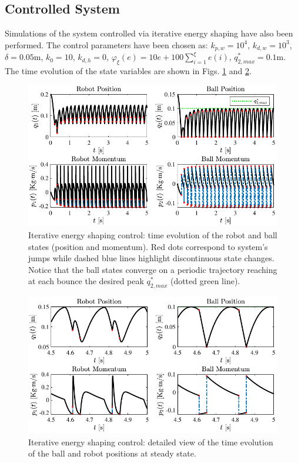 \subsection{Controlled System}
%
Simulations of the system controlled via iterative energy shaping have also been performed. The control parameters have been chosen as: $k_{p,w} = 10^4$, $k_{d,w} = 10^3$, $\delta = 0.05$m, $k_0 = 10$, $k_{d,h} = 0$, $\varphi_\xi(e) = 10e + 100\sum_{i = 1}^{\xi}e(i)$, $q_{2,max}^* = 0.1$m. The time evolution of the state variables are shown in Figs. \ref{fig:ctrl1} and \ref{fig:ctrl1_det}.
%
\begin{figure}[!ht]
	\centering
	\includegraphics[width=\linewidth]{Figures/ctrl1.pdf}
	\caption[Iterative energy shaping control: time evolution of the robot and ball states]{Iterative energy shaping control: time evolution of the robot and ball states (position and momentum). Red dots correspond to system's jumps while dashed blue lines highlight discontinuous state changes. Notice that the ball states converge on a periodic trajectory reaching at each bounce the desired peak $q^*_{2,max}$ (dotted green line).}
	\label{fig:ctrl1}
\end{figure}
%
%
\begin{figure}[!ht]
	\centering
	\includegraphics[width=\linewidth]{Figures/ctrl1_det.pdf}
	\caption[Iterative energy shaping control: detailed view of the time evolution of the ball and robot positions at steady state]{Iterative energy shaping control: detailed view of the time evolution of the ball and robot positions at steady state.}
	\label{fig:ctrl1_det}
\end{figure}
